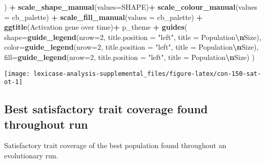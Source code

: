 \documentclass[
]{book}
\newenvironment{Shaded}{\begin{snugshade}}{\end{snugshade}}
\newcommand{\AttributeTok}[1]{\textcolor[rgb]{0.13,0.29,0.53}{#1}}
\newcommand{\DecValTok}[1]{\textcolor[rgb]{0.00,0.00,0.81}{#1}}
\newcommand{\FunctionTok}[1]{\textcolor[rgb]{0.13,0.29,0.53}{\textbf{#1}}}
\newcommand{\NormalTok}[1]{#1}
\newcommand{\SpecialCharTok}[1]{\textcolor[rgb]{0.81,0.36,0.00}{\textbf{#1}}}
\newcommand{\StringTok}[1]{\textcolor[rgb]{0.31,0.60,0.02}{#1}}
\begin{document}
\begin{Shaded}
\begin{Highlighting}[]
\NormalTok{  ) }\SpecialCharTok{+}
  \FunctionTok{scale\_shape\_manual}\NormalTok{(}\AttributeTok{values=}\NormalTok{SHAPE)}\SpecialCharTok{+}
  \FunctionTok{scale\_colour\_manual}\NormalTok{(}\AttributeTok{values =}\NormalTok{ cb\_palette) }\SpecialCharTok{+}
  \FunctionTok{scale\_fill\_manual}\NormalTok{(}\AttributeTok{values =}\NormalTok{ cb\_palette) }\SpecialCharTok{+}
  \FunctionTok{ggtitle}\NormalTok{(}\StringTok{\textquotesingle{}Activation gene over time\textquotesingle{}}\NormalTok{)}\SpecialCharTok{+}
\NormalTok{  p\_theme }\SpecialCharTok{+}
  \FunctionTok{guides}\NormalTok{(}
    \AttributeTok{shape=}\FunctionTok{guide\_legend}\NormalTok{(}\AttributeTok{nrow=}\DecValTok{2}\NormalTok{, }\AttributeTok{title.position =} \StringTok{"left"}\NormalTok{, }\AttributeTok{title =} \StringTok{\textquotesingle{}Population}\SpecialCharTok{\textbackslash{}n}\StringTok{Size\textquotesingle{}}\NormalTok{),}
    \AttributeTok{color=}\FunctionTok{guide\_legend}\NormalTok{(}\AttributeTok{nrow=}\DecValTok{2}\NormalTok{, }\AttributeTok{title.position =} \StringTok{"left"}\NormalTok{, }\AttributeTok{title =} \StringTok{\textquotesingle{}Population}\SpecialCharTok{\textbackslash{}n}\StringTok{Size\textquotesingle{}}\NormalTok{),}
    \AttributeTok{fill=}\FunctionTok{guide\_legend}\NormalTok{(}\AttributeTok{nrow=}\DecValTok{2}\NormalTok{, }\AttributeTok{title.position =} \StringTok{"left"}\NormalTok{, }\AttributeTok{title =} \StringTok{\textquotesingle{}Population}\SpecialCharTok{\textbackslash{}n}\StringTok{Size\textquotesingle{}}\NormalTok{)}
\NormalTok{  )}
\end{Highlighting}
\end{Shaded}

\texttt{[image: lexicase-analysis-supplemental\_files/figure-latex/con-150-sat-ot-1]}

\hypertarget{best-satisfactory-trait-coverage-found-throughout-run}{%
\subsection{Best satisfactory trait coverage found throughout run}\label{best-satisfactory-trait-coverage-found-throughout-run}}

Satisfactory trait coverage of the best population found throughout an evolutionary run.
\end{document}
